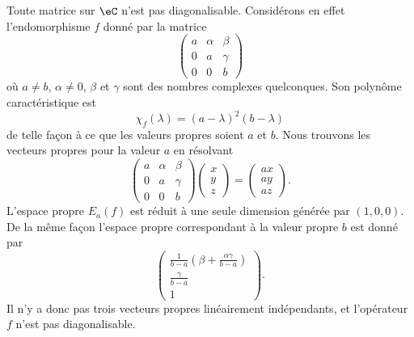 \begin{remark}
    Toute matrice sur \( \eC\) n'est pas diagonalisable. Considérons en effet l'endomorphisme \( f\) donné par la matrice
    \begin{equation}
        \begin{pmatrix}
            a&    \alpha    &   \beta    \\
            0    &   a    &   \gamma    \\
            0    &   0    &   b
        \end{pmatrix}
    \end{equation}
    où \( a\neq b\), \( \alpha\neq 0\), \( \beta\) et \( \gamma\) sont des nombres complexes quelconques.
    Son polynôme caractéristique est 
    \begin{equation}
        \chi_f(\lambda)=(a-\lambda)^2(b-\lambda)
    \end{equation}
    de telle façon à ce que les valeurs propres soient \( a\) et \( b\). Nous trouvons les vecteurs propres pour la valeur \( a\) en résolvant
    \begin{equation}
        \begin{pmatrix}
            a    &   \alpha    &   \beta    \\
            0    &   a    &   \gamma    \\
            0    &   0    &   b
        \end{pmatrix}\begin{pmatrix}
            x    \\ 
            y    \\ 
            z    
        \end{pmatrix}=\begin{pmatrix}
            ax    \\ 
            ay    \\ 
            az    
        \end{pmatrix}.
    \end{equation}
    L'espace propre \( E_a(f)\) est réduit à une seule dimension générée par \( (1,0,0)\). De la même façon l'espace propre correspondant à la valeur propre \( b\) est donné par 
    \begin{equation}
        \begin{pmatrix}
            \frac{1}{ b-a }\left( \beta+\frac{ \alpha\gamma }{ b-a } \right)    \\ 
            \frac{ \gamma }{ b-a }    \\ 
            1    
        \end{pmatrix}.
    \end{equation}
    Il n'y a donc pas trois vecteurs propres linéairement indépendants, et l'opérateur \( f\) n'est pas diagonalisable.


\end{remark}
